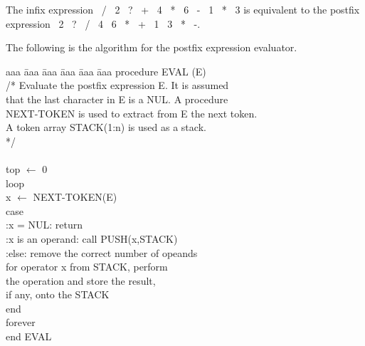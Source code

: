 The infix expression
 \, / \, 2 \, ? \, + \, 4 \, * \, 6 \, - \, 1 \, * \, 3
\eeqn
is equivalent to the postfix expression
 \, 2 \, ? \, / \, 4 \, 6 \, * \, + \, 1 \, 3 \, * \, -.
\eeqn

The following is the algorithm for the postfix expression evaluator.

\begin{tabbing}
          aaa \= aaa \= aaa \= aaa \= aaa \= aaa  \kill
          procedure EVAL (E) \\
            \> /* \> Evaluate the postfix expression E.  It is assumed  \\
            \>    \> that the last character in E is a NUL.  A procedure  \\
            \>    \> NEXT-TOKEN is used to extract from E the next token.   \\
            \>    \> A token array STACK(1:n) is used as a stack.  \\
            \> */  \\
            \> \\
            \> top $\leftarrow$ 0 \\
            \> loop \\
            \>    \> x $\leftarrow$ NEXT-TOKEN(E) \\
            \>    \>   \> case \\
            \>    \>   \> :x = NUL: return \\
            \>    \>   \> :x is an operand: call PUSH(x,STACK) \\
            \>    \>   \> :else: remove the correct number of opeands \\
            \>    \>   \>   \> for operator x from STACK, perform \\
            \>    \>   \>   \> the operation and store the result,  \\
            \>    \>   \>   \> if any, onto the STACK \\
            \>    \>   \> end \\
            \> forever \\
          end EVAL
\end{tabbing}
